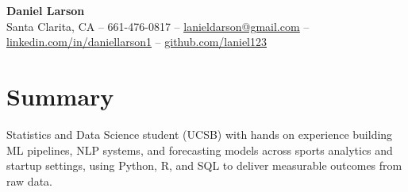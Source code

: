 \newcommand{\resumeProjectHeading}[2]{
    \item
    \small#1\hfill{#2}\\
    \vspace{-7pt}
}
 
\newcommand{\resumeSubItem}[1]{\resumeItem{#1}\vspace{-4pt}}
 
\renewcommand\labelitemii{$\vcenter{\hbox{\tiny$\bullet$}}$}
 
\newcommand{\resumeSubHeadingListStart}{\begin{itemize}[leftmargin=0.15in, label={}]}
\newcommand{\resumeSubHeadingListEnd}{\end{itemize}}
\newcommand{\resumeItemListStart}{\begin{itemize}[itemsep=0pt, parsep=0pt]}
\newcommand{\resumeItemListEnd}{\end{itemize}\vspace{-5pt}}
 

 
\begin{center}
    \textbf{\fontsize{16}{18}\selectfont Daniel Larson} \\ \vspace{1pt}
    \small Santa Clarita, CA -- 661-476-0817 -- \href{mailto:lanieldarson@gmail.com}{\underline{lanieldarson@gmail.com}} --
    \href{https://www.linkedin.com/in/daniellarson1}{\underline{linkedin.com/in/daniellarson1}} --
    \href{https://github.com/laniel123}{\underline{github.com/laniel123}}
\end{center}
 
\section{Summary}
\small Statistics and Data Science student (UCSB) with hands on experience building ML pipelines, NLP systems, and forecasting models across sports analytics and startup settings, using Python, R, and SQL to deliver measurable outcomes from raw data.\vspace{-8pt}
 
